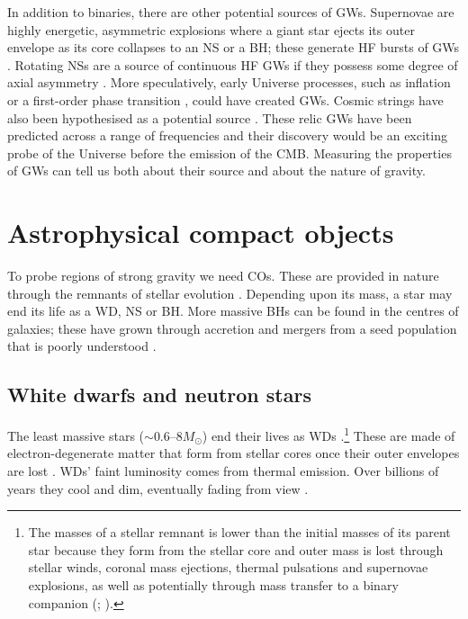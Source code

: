 In addition to binaries, there are other potential sources of GWs. Supernovae are highly energetic, asymmetric explosions where a giant star ejects its outer envelope as its core collapses to an NS or a BH; these generate HF bursts of GWs \citep{Dimmelmeier2002,Kotake2006}. Rotating NSs are a source of continuous HF GWs if they possess some degree of axial asymmetry \citep{Abbott2007,Prix2009}. More speculatively, early Universe processes, such as inflation \citep{Grishchuk2005} or a first-order phase transition \citep{Binetruy2012}, could have created GWs. Cosmic strings have also been hypothesised as a potential source \citep{Damour2005,Binetruy2012}. These relic GWs have been predicted across a range of frequencies and their discovery would be an exciting probe of the Universe before the emission of the CMB. Measuring the properties of GWs can tell us both about their source and about the nature of gravity.

\section{Astrophysical compact objects}\label{sec:COs}

To probe regions of strong gravity we need COs. These are provided in nature through the remnants of stellar evolution \citep[section 1.1]{Shapiro1983}. Depending upon its mass, a star may end its life as a WD, NS or BH. More massive BHs can be found in the centres of galaxies; these have grown through accretion and mergers from a seed population that is poorly understood \citep{Volonteri2010}.

\subsection{White dwarfs and neutron stars}

The least massive stars ($\sim0.6$--$8M_\odot$) end their lives as WDs \citep{Poelarends2008}.\footnote{The masses of a stellar remnant is lower than the initial masses of its parent star because they form from the stellar core and outer mass is lost through stellar winds, coronal mass ejections, thermal pulsations and supernovae explosions, as well as potentially through mass transfer to a binary companion (\citealt[section 0.7]{Weiss2004}; \citealt{Puls2008,Woosley2002}).} These are made of electron-degenerate matter that form from stellar cores once their outer envelopes are lost \citep{Althaus2010}. WDs' faint luminosity comes from thermal emission. Over billions of years they cool and dim, eventually fading from view \citep[section 4.2]{Shapiro1983}.

